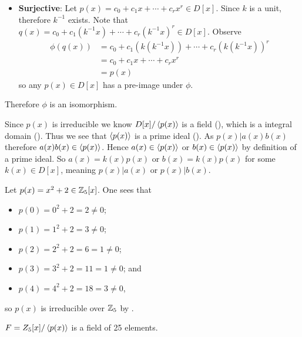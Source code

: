 \begin{questions}
\begin{itemize}
        \item \textbf{Surjective}: Let $p(x) = c_0 + c_1x + \cdots + c_rx^r \in D[x]$. Since $k$ is a unit, therefore $k^{-1}$ exists. Note that $q(x) = c_0 + c_1(k^{-1}x) + \cdots + c_r(k^{-1}x)^r \in D[x]$. Observe
        \begin{align*}
            \phi(q(x)) &= c_0 + c_1(k(k^{-1}x)) + \cdots + c_r(k(k^{-1}x))^r\\
            &= c_0 + c_1x + \cdots + c_rx^r\\
            &= p(x)
        \end{align*}
        so any $p(x) \in D[x]$ has a pre-image under $\phi$.
    \end{itemize}
    Therefore $\phi$ is an isomorphism.

    \item Since $p(x)$ is irreducible we know $D[x]/\left\langle p(x)\right\rangle$ is a field (), which is a integral domain (). Thus we see that $\left\langle p(x)\right\rangle$ is a prime ideal (). As $p(x) \vert a(x)b(x)$ therefore $a(x)b(x) \in \left\langle p(x)\right\rangle$. Hence $a(x) \in \left\langle p(x)\right\rangle$ or $b(x) \in \left\langle p(x)\right\rangle$ by definition of a prime ideal. So $a(x) = k(x)p(x)$ or $b(x) = k(x)p(x)$ for some $k(x) \in D[x]$, meaning $p(x) \vert a(x)$ or $p(x) \vert b(x)$.

    \item \begin{partquestions}{\roman*}
        \item Let $p(x) = x^2 + 2 \in \mathbb{Z}_5[x]$. One sees that
        \begin{itemize}
            \item $p(0) = 0^2 + 2 = 2 \neq 0$;
            \item $p(1) = 1^2 + 2 = 3 \neq 0$;
            \item $p(2) = 2^2 + 2 = 6 = 1 \neq 0$;
            \item $p(3) = 3^2 + 2 = 11 = 1 \neq 0$; and
            \item $p(4) = 4^2 + 2 = 18 = 3 \neq 0$,
        \end{itemize}
        so $p(x)$ is irreducible over $\mathbb{Z}_5$ by .

        \item $F = Z_5[x]/\left\langle p(x)\right\rangle$ is a field of 25 elements.


\end{partquestions}
\end{questions}
